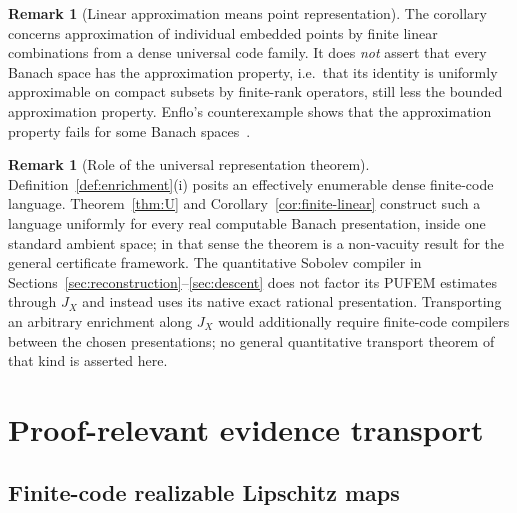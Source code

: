 \documentclass[11pt]{article}
\theoremstyle{definition}
\newtheorem{remark}[theorem]{Remark}
\begin{document}
\begin{remark}[Linear approximation means point representation]
The corollary concerns approxi\-mation of individual embedded points by finite linear
combinations from a dense universal code family.  It does \emph{not} assert that every
Banach space has the approximation property, i.e.\ that its identity is uniformly
approximable on compact subsets by finite-rank operators, still less the bounded
approximation property.  Enflo's counterexample shows that the approximation property
fails for some Banach spaces~\cite{Enflo}.
\end{remark}

\begin{remark}[Role of the universal representation theorem]\label{rem:role-universal}
Definition~\ref{def:enrichment}(i) posits an effectively enumerable dense finite-code
language.  Theorem~\ref{thm:U} and Corollary~\ref{cor:finite-linear} construct such a
language uniformly for every real computable Banach presentation, inside one standard
ambient space; in that sense the theorem is a non-vacuity result for the general certificate
framework.  The quantitative Sobolev compiler in
Sections~\ref{sec:reconstruction}--\ref{sec:descent} does not factor its PUFEM estimates
through $J_X$ and instead uses its native exact rational presentation.  Transporting an
arbitrary enrichment along $J_X$ would additionally require finite-code compilers between
the chosen presentations; no general quantitative transport theorem of that kind is asserted here.
\end{remark}

\section{Proof-relevant evidence transport}\label{sec:lifts}

\subsection{Finite-code realizable Lipschitz maps}
\end{document}
